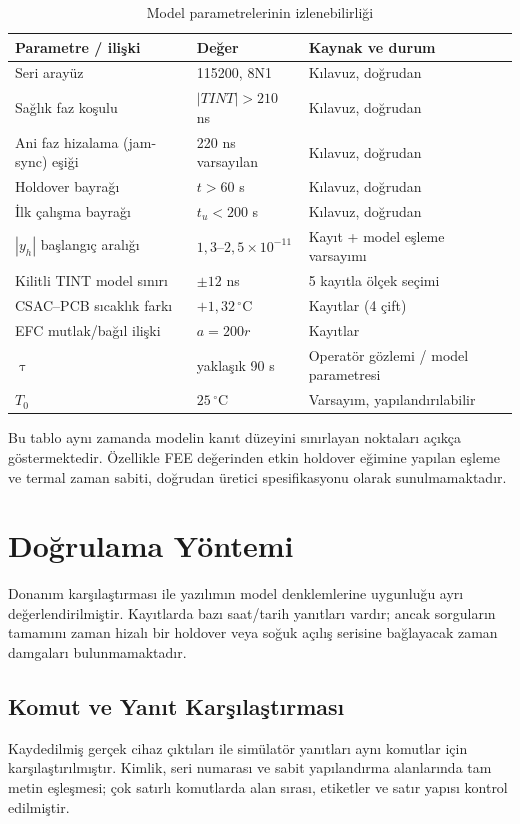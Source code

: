 \documentclass[9pt,twocolumn,a4paper]{extarticle}
\begin{document}
\begin{table}[t]
\caption{Model parametrelerinin izlenebilirliği}
\label{tab:trace}
\centering
\fontsize{9}{10.8}\selectfont
\setlength{\tabcolsep}{3pt}
\begin{tabular}{p{}p{}p{}}
\toprule
\textbf{Parametre / ilişki} & \textbf{Değer} & \textbf{Kaynak ve durum} \\
\midrule
Seri arayüz & 115200, 8N1 & Kılavuz, doğrudan \\
Sağlık faz koşulu & $|TINT|>210$ ns & Kılavuz, doğrudan \\
Ani faz hizalama (jam-sync) eşiği & 220 ns varsayılan & Kılavuz, doğrudan \\
Holdover bayrağı & $t>60$ s & Kılavuz, doğrudan \\
İlk çalışma bayrağı & $t_u<200$ s & Kılavuz, doğrudan \\
$|y_h|$ başlangıç aralığı & $1{,}3$--$2{,}5\times10^{-11}$ & Kayıt + model eşleme varsayımı \\
Kilitli TINT model sınırı & $\pm12$ ns & 5 kayıtla ölçek seçimi \\
CSAC--PCB sıcaklık farkı & $+1{,}32\,^{\circ}$C & Kayıtlar (4 çift) \\
EFC mutlak/bağıl ilişki & $a=200r$ & Kayıtlar \\
$\uptau$ & yaklaşık 90 s & Operatör gözlemi / model parametresi \\
$T_0$ & $25\,^{\circ}$C & Varsayım, yapılandırılabilir \\
\bottomrule
\end{tabular}
\end{table}

Bu tablo aynı zamanda modelin kanıt düzeyini sınırlayan noktaları açıkça göstermektedir. Özellikle FEE değerinden etkin holdover eğimine yapılan eşleme ve termal zaman sabiti, doğrudan üretici spesifikasyonu olarak sunulmamaktadır.

\section{Doğrulama Yöntemi}
Donanım karşılaştırması ile yazılımın model denklemlerine uygunluğu ayrı değerlendirilmiştir. Kayıtlarda bazı saat/tarih yanıtları vardır; ancak sorguların tamamını zaman hizalı bir holdover veya soğuk açılış serisine bağlayacak zaman damgaları bulunmamaktadır.

\subsection{Komut ve Yanıt Karşılaştırması}
Kaydedilmiş gerçek cihaz çıktıları ile simülatör yanıtları aynı komutlar için karşılaştırılmıştır. Kimlik, seri numarası ve sabit yapılandırma alanlarında tam metin eşleşmesi; çok satırlı komutlarda alan sırası, etiketler ve satır yapısı kontrol edilmiştir.
\end{document}

